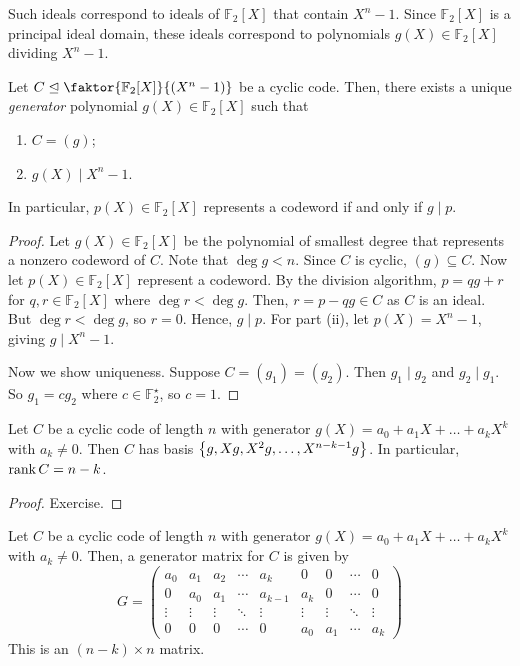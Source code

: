 Such ideals correspond to ideals of \( \mathbb F_2[X] \) that contain \( X^n - 1 \).
Since \( \mathbb F_2[X] \) is a principal ideal domain, these ideals correspond to polynomials \( g(X) \in \mathbb F_2[X] \) dividing \( X^n - 1 \).
\begin{theorem}
    Let \( C \trianglelefteq \faktor{\mathbb F_2[X]}{(X^n - 1)} \) be a cyclic code.
    Then, there exists a unique \emph{generator} polynomial \( g(X) \in \mathbb F_2[X] \) such that
    \begin{enumerate}
        \item \( C = (g) \);
        \item \( g(X) \mid X^n - 1 \).
    \end{enumerate}
    In particular, \( p(X) \in \mathbb F_2[X] \) represents a codeword if and only if \( g \mid p \).
\end{theorem}
\begin{proof}
    Let \( g(X) \in \mathbb F_2[X] \) be the polynomial of smallest degree that represents a nonzero codeword of \( C \).
    Note that \( \deg g < n \).
    Since \( C \) is cyclic, \( (g) \subseteq C \).
    Now let \( p(X) \in \mathbb F_2[X] \) represent a codeword.
    By the division algorithm, \( p = qg + r \) for \( q, r \in \mathbb F_2[X] \) where \( \deg r < \deg g \).
    Then, \( r = p - qg \in C \) as \( C \) is an ideal.
    But \( \deg r < \deg g \), so \( r = 0 \).
    Hence, \( g \mid p \).
    For part (ii), let \( p(X) = X^n - 1 \), giving \( g \mid X^n - 1 \).

    Now we show uniqueness.
    Suppose \( C = (g_1) = (g_2) \).
    Then \( g_1 \mid g_2 \) and \( g_2 \mid g_1 \).
    So \( g_1 = cg_2 \) where \( c \in \mathbb F_2^\star \), so \( c = 1 \).
\end{proof}
\begin{lemma}
    Let \( C \) be a cyclic code of length \( n \) with generator \( g(X) = a_0 + a_1 X + \dots + a_k X^k \) with \( a_k \neq 0 \).
    Then \( C \) has basis \( \qty{g, Xg, X^2g, \dots, X^{n-k-1}g} \).
    In particular, \( \rank C = n - k \).
\end{lemma}
\begin{proof}
    Exercise.
\end{proof}
\begin{corollary}
    Let \( C \) be a cyclic code of length \( n \) with generator \( g(X) = a_0 + a_1 X + \dots + a_k X^k \) with \( a_k \neq 0 \).
    Then, a generator matrix for \( C \) is given by
    \[ G = \begin{pmatrix}
        a_0 & a_1 & a_2 & \cdots & a_k & 0 & 0 & \cdots & 0 \\
        0 & a_0 & a_1 & \cdots & a_{k-1} & a_k & 0 & \cdots & 0 \\
        \vdots & \vdots & \vdots & \ddots & \vdots & \vdots & \vdots & \ddots & \vdots \\
        0 & 0 & 0 & \cdots & 0 & a_0 & a_1 & \cdots & a_k
    \end{pmatrix} \]
    This is an \( (n - k) \times n \) matrix.
\end{corollary}

